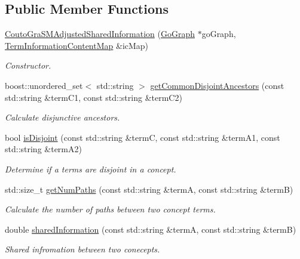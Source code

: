 \subsection*{Public Member Functions}
\begin{DoxyCompactItemize}
\item 
\hyperlink{classCoutoGraSMAdjustedSharedInformation_a4a04a361710cd2d01d684756dfaffdaa}{Couto\+Gra\+S\+M\+Adjusted\+Shared\+Information} (\hyperlink{classGoGraph}{Go\+Graph} $\ast$go\+Graph, \hyperlink{classTermInformationContentMap}{Term\+Information\+Content\+Map} \&ic\+Map)
\begin{DoxyCompactList}\small\item\em Constructor. \end{DoxyCompactList}\item 
boost\+::unordered\+\_\+set$<$ std\+::string $>$ \hyperlink{classCoutoGraSMAdjustedSharedInformation_a1cabbefb71400f4a09a43f2ee772dd13}{get\+Common\+Disjoint\+Ancestors} (const std\+::string \&term\+C1, const std\+::string \&term\+C2)
\begin{DoxyCompactList}\small\item\em Calculate disjunctive ancestors. \end{DoxyCompactList}\item 
bool \hyperlink{classCoutoGraSMAdjustedSharedInformation_a1075d42621e143afd799a88d49964f6e}{is\+Disjoint} (const std\+::string \&termC, const std\+::string \&term\+A1, const std\+::string \&term\+A2)
\begin{DoxyCompactList}\small\item\em Determine if a terms are disjoint in a concept. \end{DoxyCompactList}\item 
std\+::size\+\_\+t \hyperlink{classCoutoGraSMAdjustedSharedInformation_aad9e157135c5d9de7c5e7f49c3d812b4}{get\+Num\+Paths} (const std\+::string \&termA, const std\+::string \&termB)
\begin{DoxyCompactList}\small\item\em Calculate the number of paths between two concept terms. \end{DoxyCompactList}\item 
double \hyperlink{classCoutoGraSMAdjustedSharedInformation_ac93a66e1b8efafc8cd1c166424241af9}{shared\+Information} (const std\+::string \&termA, const std\+::string \&termB)
\begin{DoxyCompactList}\small\item\em Shared infromation between two conecepts. \end{DoxyCompactList}\item 

\end{DoxyCompactItemize}
